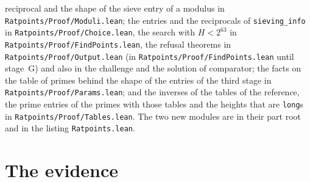 reciprocal and the shape of the sieve entry of a modulus in \verb|Ratpoints/Proof/Moduli.lean|; the
entries and the reciprocals of \verb|sieving_info| in \verb|Ratpoints/Proof/Choice.lean|, the search
with $H < 2^{63}$ in \verb|Ratpoints/Proof/FindPoints.lean|, the refusal theorems in
\verb|Ratpoints/Proof/Output.lean| (in \verb|Ratpoints/Proof/FindPoints.lean| until stage~G) and
also in the challenge and the solution of comparator; the facts on the table of primes behind the
shape of the entries of the third stage in \verb|Ratpoints/Proof/Params.lean|; and the inverses of
the tables of the reference, the prime entries of the primes with those tables and the heights that
are \verb|long|s in \verb|Ratpoints/Proof/Tables.lean|. The two new modules are in their part root
and in the listing \verb|Ratpoints.lean|.

\section{The evidence}\label{sec:stages-evidence}

